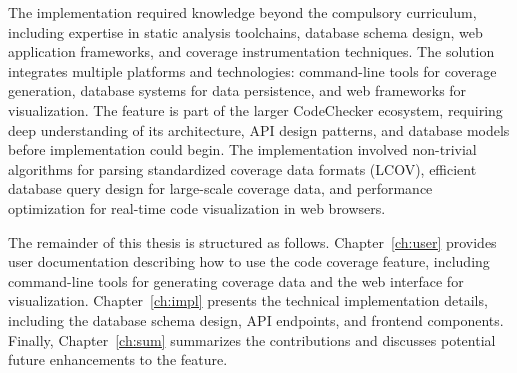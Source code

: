 The implementation required knowledge beyond the compulsory curriculum, including expertise in static analysis toolchains, database schema design, web application frameworks, and coverage instrumentation techniques. The solution integrates multiple platforms and technologies: command-line tools for coverage generation, database systems for data persistence, and web frameworks for visualization. The feature is part of the larger CodeChecker ecosystem, requiring deep understanding of its architecture, API design patterns, and database models before implementation could begin. The implementation involved non-trivial algorithms for parsing standardized coverage data formats (LCOV), efficient database query design for large-scale coverage data, and performance optimization for real-time code visualization in web browsers.

The remainder of this thesis is structured as follows. Chapter~\ref{ch:user} provides user documentation describing how to use the code coverage feature, including command-line tools for generating coverage data and the web interface for visualization. Chapter~\ref{ch:impl} presents the technical implementation details, including the database schema design, API endpoints, and frontend components. Finally, Chapter~\ref{ch:sum} summarizes the contributions and discusses potential future enhancements to the feature. 
